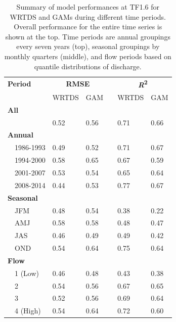 \documentclass[letterpaper,12pt,oneside]{article}\usepackage[]{graphicx}\usepackage[]{color}
\begin{document}
\begin{table}[!tbp]
\caption{Summary of model performances at TF1.6 for \ac{WRTDS} and \acp{GAM} during different time periods.  Overall performance for the entire time series is shown at the top.  Time periods are annual groupings every seven years (top), seasonal groupings by monthly quarters (middle), and flow periods based on quantile distributions of discharge.\label{tab:perfTF16}} 
\begin{center}
\begin{tabular}{lllcll}
\hline\hline
\multicolumn{1}{l}{\bfseries Period}&\multicolumn{2}{c}{\bfseries RMSE}&\multicolumn{1}{c}{\bfseries }&\multicolumn{2}{c}{\bfseries {\bf \textit{R}\textsuperscript{2}}}\tabularnewline
\cline{2-3} \cline{5-6}
\multicolumn{1}{l}{}&\multicolumn{1}{c}{WRTDS}&\multicolumn{1}{c}{GAM}&\multicolumn{1}{c}{}&\multicolumn{1}{c}{WRTDS}&\multicolumn{1}{c}{GAM}\tabularnewline
\hline
{\bfseries All}&&&&&\tabularnewline
~~&0.52&0.56&&0.71&0.66\tabularnewline
\hline
{\bfseries Annual}&&&&&\tabularnewline
~~1986-1993&0.49&0.52&&0.71&0.67\tabularnewline
~~1994-2000&0.58&0.65&&0.67&0.59\tabularnewline
~~2001-2007&0.53&0.54&&0.65&0.64\tabularnewline
~~2008-2014&0.44&0.53&&0.77&0.67\tabularnewline
\hline
{\bfseries Seasonal}&&&&&\tabularnewline
~~JFM&0.48&0.54&&0.38&0.22\tabularnewline
~~AMJ&0.58&0.58&&0.48&0.47\tabularnewline
~~JAS&0.46&0.49&&0.49&0.42\tabularnewline
~~OND&0.54&0.64&&0.75&0.64\tabularnewline
\hline
{\bfseries Flow}&&&&&\tabularnewline
~~1 (Low)&0.46&0.48&&0.43&0.38\tabularnewline
~~2&0.54&0.56&&0.67&0.65\tabularnewline
~~3&0.52&0.56&&0.69&0.64\tabularnewline
~~4 (High)&0.54&0.64&&0.72&0.60\tabularnewline
\hline
\end{tabular}\end{center}

\end{table}
\end{document}
